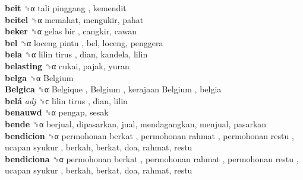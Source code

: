\textbf{beit} ␝α   tali pinggang , kemendit  \\
\textbf{beitel} ␝α  memahat, mengukir, pahat  \\
\textbf{beker} ␝α   gelas bir , cangkir, cawan  \\
\textbf{bel} ␝α   loceng pintu , bel, loceng, penggera  \\
\textbf{bela} ␝α   lilin tirus , dian, kandela, lilin  \\
\textbf{belasting} ␝α  cukai, pajak, yuran  \\
\textbf{belga} ␝α   Belgium   \\
\textbf{Belgica} ␝α   Belgique ,  Belgium ,  kerajaan Belgium , belgia  \\
\textbf{belá} \emph{adj}  ␝ϲ   lilin tirus , dian, lilin  \\
\textbf{benauwd} ␝α  pengap, sesak  \\
\textbf{bende} ␝α  berjual, dipasarkan, jual, mendagangkan, menjual, pasarkan  \\
\textbf{bendicion} ␝α   permohonan berkat ,  permohonan rahmat ,  permohonan restu ,  ucapan syukur , berkah, berkat, doa, rahmat, restu  \\
\textbf{bendiciona} ␝α   permohonan berkat ,  permohonan rahmat ,  permohonan restu ,  ucapan syukur , berkah, berkat, doa, rahmat, restu  \\

